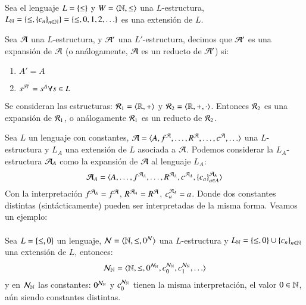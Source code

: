 \begin{eg}
    Sea el lenguaje $L = \left\{\leq\right\}$ y $W = \langle\mathbb{N}, \leq\rangle$ una $L$-estructura, $L_{\mathbb{N}} = \left\{\leq, \left\{c_n\right\}_{n \in \mathbb{N}}\right\} = \left\{\leq, 0, 1, 2, \ldots\right\}$ es una extensión de $L$.
\end{eg}

\begin{dfn}
    Sea $\mathcal{A}$ una $L$-estructura, y $\mathcal{A}'$ una $L'$-estructura, decimos que $\mathcal{A}'$ es una expansión de $\mathcal{A}$ (o análogamente, $\mathcal{A}$ es un reducto de $\mathcal{A}'$) si:
    \begin{enumerate}
        \item $A' = A$
        \item $s^{\mathcal{A}'} = s^A \forall s \in L$
    \end{enumerate}
\end{dfn}

\begin{eg}
    Se consideran las estructuras: $\mathcal{R}_1 = \langle\mathbb{R}, +\rangle$ y $\mathcal{R}_2 = \langle\mathbb{R}, +, \cdot\rangle$. Entonces $\mathcal{R}_2$ es una expansión de $\mathcal{R}_1$, o análogamente $\mathcal{R}_1$ es un reducto de $\mathcal{R}_2$.
\end{eg}

\begin{obs}
    Sea $L$ un lenguaje con constantes, $\mathcal{A} = \langle A, f^{\mathcal{A}}, \ldots, R^{\mathcal{A}}, \ldots, c^{\mathcal{A}}, \ldots\rangle$ una $L$-estructura y $L_A$ una extensión de $L$ asociada a $\mathcal{A}$. Podemos considerar la $L_A$-estructura $\mathcal{A}_A$ como la expansión de $\mathcal{A}$ al lenguaje $L_A$:
    $$
        \mathcal{A}_A = \langle A, \ldots, f^{\mathcal{A}_A}, \ldots, R^{\mathcal{A}_A}, c^{\mathcal{A}_A}, \left\{c_a\right\}^{\mathcal{A}_A}_{a \in A}\rangle
    $$
    Con la interpretación $f^{\mathcal{A}_A} = f^{\mathcal{A}}$, $R^{\mathcal{A}_A} = R^{\mathcal{A}}$, $c_a^{\mathcal{A}_A} = a$.
    Donde dos constantes distintas (sintácticamente) pueden ser interpretadas de la misma forma. Veamos un ejemplo:\\\\

    Sea $L = \left\{\leq, 0\right\}$ un lenguaje, $\mathcal{N} = \langle\mathbb{N}, \leq, 0^{\mathcal{N}}\rangle$ una $L$-estructura y $L_{\mathbb{N}} = \left\{\leq, 0\right\} \cup \left\{c_n\right\}_{n \in \mathbb{N}}$ una extensión de $L$, entonces:
    $$
        \mathcal{N}_{\mathbb{N}} = \langle\mathbb{N}, \leq, 0^{\mathcal{N}_{\mathbb{N}}}, c_0^{\mathcal{N}_{\mathbb{N}}}, c_1^{\mathcal{N}_{\mathbb{N}}}, \ldots\rangle
    $$
    y en $\mathcal{N}_{\mathbb{N}}$ las constantes: $0^{\mathcal{N}_{\mathbb{N}}}$ y $c_0^{\mathcal{N}_{\mathbb{N}}}$ tienen la misma interpretación, el valor $0 \in \mathbb{N}$, aún siendo constantes distintas.
\end{obs}
